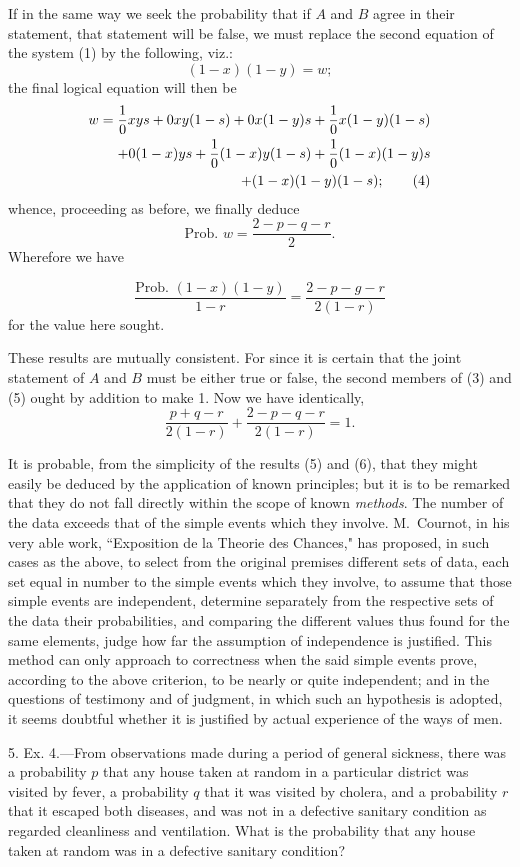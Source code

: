 \documentclass[oneside]{book}
\begin{document}
If in the same way we seek the probability that if $A$ and $B$
agree in their statement, that statement will be false, we must
replace the second equation of the system (1) by the following,
viz.:
\[
  (1-x)(1-y) = w;
\]
the final logical equation will then be
\begin{gather*}
  w = \frac{1}{0}xys + 0xy(1-s) + 0x(1-y)s + \frac{1}{0}x(1-y)(1-s)\\
\hfill + 0(1-x)ys + \frac{1}{0}(1-x)y(1-s) + \frac{1}{0}(1-x)(1-y)s \\
\hfill + (1-x)(1-y)(1-s);   \tag{4}
\end{gather*}
whence, proceeding as before, we finally deduce
\[
  \text{Prob. }w = \frac{2 - p - q - r}{2}.   \tag{5}
\]
Wherefore we have

\[
\frac{\text{Prob. } (1-x)(1-y)}{1-r} = \frac{2-p-g-r}{2(1-r)} \tag{6}
\]
for the value here sought.

These results are mutually consistent. For since it is certain
that the joint statement of $A$ and $B$ must be either true or false,
the second members of (3) and (5) ought by addition to make 1.
Now we have identically,
\[
\frac{p+q-r}{2(1-r)} + \frac{2-p-q-r}{2(1-r)} = 1.
\]

It is probable, from the simplicity of the results (5) and (6),
that they might easily be deduced by the application of known
principles; but it is to be remarked that they do not fall directly
within the scope of known \emph{methods}. The number of the data
exceeds that of the simple events which they involve. M.~Cournot,
in his very able work, ``Exposition de la Theorie des
Chances," has proposed, in such cases as the above, to select
from the original premises different sets of data, each set equal in
number to the simple events which they involve, to assume that
those simple events are independent, determine separately from
the respective sets of the data their probabilities, and comparing
the different values thus found for the same elements, judge how
far the assumption of independence is justified. This method
can only approach to correctness when the said simple events
prove, according to the above criterion, to be nearly or quite independent;
and in the questions of testimony and of judgment,
in which such an hypothesis is adopted, it seems doubtful whether
it is justified by actual experience of the ways of men.

5. Ex. 4.---From observations made during a period of general
sickness, there was a probability $p$ that any house taken at
random in a particular district was visited by fever, a probability
$q$ that it was visited by cholera, and a probability $r$ that it escaped
both diseases, and was not in a defective sanitary condition
as regarded cleanliness and ventilation. What is the probability
that any house taken at random was in a defective sanitary
condition?
\end{document}
